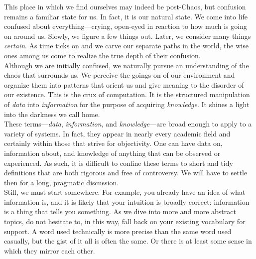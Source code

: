 This place in which we find ourselves may indeed be post-Chaos, but confusion remains a familiar state for us. In fact, it is our natural state. We come into life confused about everything---crying, open-eyed in reaction to how much is going on around us. Slowly, we figure a few things out. Later, we consider many things \textit{certain}. As time ticks on and we carve our separate paths in the world, the wise ones among us come to realize the true depth of their confusion. \\

Although we are initially confused, we naturally pursue an understanding of the chaos that surrounds us. We perceive the goings-on of our environment and organize them into patterns that orient us and give meaning to the disorder of our existence. This is the crux of computation. It is the structured manipulation of \textit{data} into \textit{information} for the purpose of acquiring \textit{knowledge}. It shines a light into the darkness we call home. \\

These terms---\textit{data}, \textit{information}, and \textit{knowledge}---are broad enough to apply to a variety of systems. In fact, they appear in nearly every academic field and certainly within those that strive for objectivity. One can have data on, information about, and knowledge of anything that can be observed or experienced. As such, it is difficult to confine these terms to short and tidy definitions that are both rigorous and free of controversy. We will have to settle then for a long, pragmatic discussion. \\

Still, we must start somewhere. For example, you already have an idea of what information is, and it is likely that your intuition is broadly correct: information is a thing that tells you something. As we dive into more and more abstract topics, do not hesitate to, in this way, fall back on your existing vocabulary for support. A word used technically is more precise than the same word used casually, but the gist of it all is often the same. Or there is at least some sense in which they mirror each other. \\

